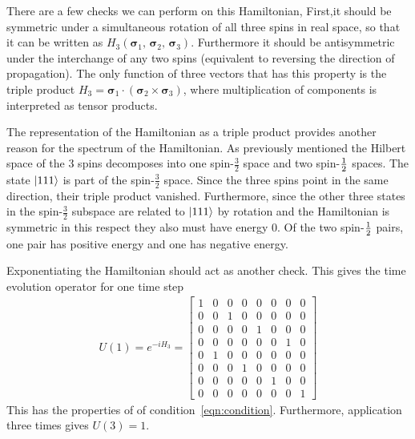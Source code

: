 There are a few checks we can perform on this Hamiltonian, First,it should be symmetric under a simultaneous rotation of all three spins in real space, so that it can be written as $H_3(\bm{\sigma}_1,\,\bm{\sigma}_2 ,\,\bm{\sigma}_3)$. Furthermore it should be antisymmetric under the interchange of any two spins (equivalent to reversing the direction of propagation). The only function of three vectors that has this property is the triple product $H_3= \bm{\sigma}_1\cdot\left(\bm{\sigma}_2 \times\bm{\sigma}_3\right)$, where multiplication of components is interpreted as tensor products.

The representation of the Hamiltonian as a triple product provides another reason for the spectrum of the Hamiltonian. As previously mentioned the Hilbert space of the 3 spins decomposes into one spin-$\frac{3}{2}$ space and two spin-$\frac{1}{2}$ spaces. The state $\left|111\right\rangle$ is part of the spin-$\frac{3}{2}$ space. Since the three spins point in the same direction, their triple product vanished. Furthermore, since the other three states in the spin-$\frac{3}{2}$ subspace are related to $\left|111\right\rangle$ by rotation and the Hamiltonian is symmetric in this respect they also must have energy 0. Of the two spin-$\frac{1}{2}$ pairs, one pair has positive energy and one has negative energy.


Exponentiating the Hamiltonian should act as another check. This gives the time evolution operator for one time step
\begin{align}
U(1) = e^{-iH_3} = \begin{bmatrix}
1 & 0 & 0 & 0 & 0 & 0 & 0 & 0 \\
0 & 0 & 1 & 0 & 0 & 0 & 0 & 0 \\
0 & 0 & 0 & 0 & 1 & 0 & 0 & 0 \\
0 & 0 & 0 & 0 & 0 & 0 & 1 & 0 \\
0 & 1 & 0 & 0 & 0 & 0 & 0 & 0 \\
0 & 0 & 0 & 1 & 0 & 0 & 0 & 0 \\
0 & 0 & 0 & 0 & 0 & 1 & 0 & 0 \\
0 & 0 & 0 & 0 & 0 & 0 & 0 & 1
\end{bmatrix}
\end{align}
This has the properties of of condition~\ref{eqn:condition}. Furthermore, application three times gives $U(3) = 1$. 

